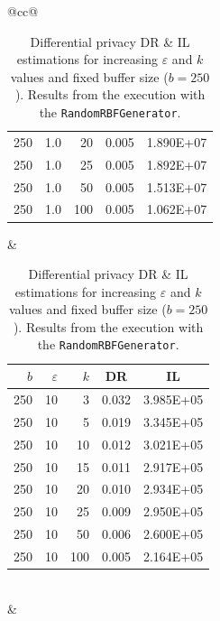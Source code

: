 \begin{table}[H]
\begin{tabular}{@{}cc@{}}
\begin{tabular}{@{}rrrrr@{}}
			250 & 1.0 & 20  & 0.005 & 1.890E+07 \\
			250 & 1.0 & 25  & 0.005 & 1.892E+07 \\
			250 & 1.0 & 50  & 0.005 & 1.513E+07 \\
			250 & 1.0 & 100 & 0.005 & 1.062E+07 \\ \bottomrule
		\end{tabular}
		&
		\begin{tabular}{@{}rrrrr@{}}
			\toprule
			$b$ & $\varepsilon$ & $k$ & \multicolumn{1}{c}{DR} & \multicolumn{1}{c}{IL} \\ \midrule
			250 & 10 & 3   & 0.032 & 3.985E+05 \\
			250 & 10 & 5   & 0.019 & 3.345E+05 \\
			250 & 10 & 10  & 0.012 & 3.021E+05 \\
			250 & 10 & 15  & 0.011 & 2.917E+05 \\
			250 & 10 & 20  & 0.010 & 2.934E+05 \\
			250 & 10 & 25  & 0.009 & 2.950E+05 \\
			250 & 10 & 50  & 0.006 & 2.600E+05 \\
			250 & 10 & 100 & 0.005 & 2.164E+05 \\ \bottomrule
		\end{tabular}
		\\ & \\
	\end{tabular}
	\caption[Differential privacy DR \& IL estimations.]{Differential privacy DR \& IL estimations for increasing $\varepsilon$ and $k$ values and fixed buffer size ($b = 250$). Results from the execution with the \texttt{RandomRBFGenerator}.}
	\label{table:results-random-diff-priv}
\end{table}

